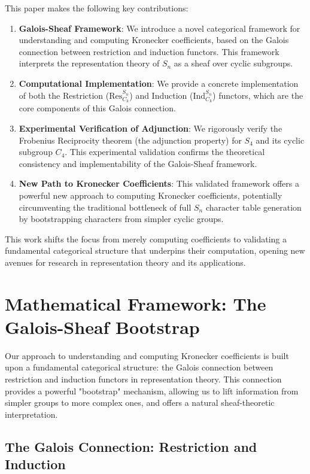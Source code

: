 \documentclass[11pt]{article}
\theoremstyle{definition}
\theoremstyle{remark}
\begin{document}
This paper makes the following key contributions:
\begin{enumerate}
    \item \textbf{Galois-Sheaf Framework}: We introduce a novel categorical framework for understanding and computing Kronecker coefficients, based on the Galois connection between restriction and induction functors. This framework interprets the representation theory of $S_n$ as a sheaf over cyclic subgroups.
    \item \textbf{Computational Implementation}: We provide a concrete implementation of both the Restriction ($\text{Res}^{S_n}_{C_k}$) and Induction ($\text{Ind}_{C_k}^{S_n}$) functors, which are the core components of this Galois connection.
    \item \textbf{Experimental Verification of Adjunction}: We rigorously verify the Frobenius Reciprocity theorem (the adjunction property) for $S_4$ and its cyclic subgroup $C_4$. This experimental validation confirms the theoretical consistency and implementability of the Galois-Sheaf framework.
    \item \textbf{New Path to Kronecker Coefficients}: This validated framework offers a powerful new approach to computing Kronecker coefficients, potentially circumventing the traditional bottleneck of full $S_n$ character table generation by bootstrapping characters from simpler cyclic groups.
\end{enumerate}
This work shifts the focus from merely computing coefficients to validating a fundamental categorical structure that underpins their computation, opening new avenues for research in representation theory and its applications.

\section{Mathematical Framework: The Galois-Sheaf Bootstrap}

Our approach to understanding and computing Kronecker coefficients is built upon a fundamental categorical structure: the Galois connection between restriction and induction functors in representation theory. This connection provides a powerful "bootstrap" mechanism, allowing us to lift information from simpler groups to more complex ones, and offers a natural sheaf-theoretic interpretation.

\subsection{The Galois Connection: Restriction and Induction}
\end{document}
